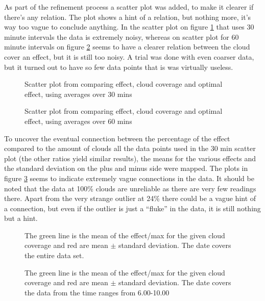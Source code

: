 As part of the refinement process a scatter plot was added, to make it
clearer if there's any relation.  The plot shows a hint of a relation,
but nothing more, it's way too vague to conclude anything.  In the
scatter plot on figure \ref{fig:scatter30} that uses 30 minute
intervals the data is extremely noisy, whereas on scatter plot for 60
minute intervals on figure \ref{fig:scatter60} seems to have a clearer
relation between the cloud cover an effect, but it is still too noisy.
A trial was done with even coarser data, but it turned out to have so
few data points that is was virtually useless.

\begin{figure}
  \centering
  \tiny
  
  \caption{Scatter plot from comparing effect, cloud coverage and
    optimal effect, using averages over 30 mins}
  \label{fig:scatter30}
\end{figure}

\begin{figure}
  \centering
      \tiny
      
  \caption{Scatter plot from comparing effect, cloud coverage and
    optimal effect, using averages over 60 mins}
  \label{fig:scatter60}
\end{figure}

To uncover the eventual connection between the percentage of the
effect compared to the amount of clouds all the data points used in
the 30 min scatter plot (the other ratios yield similar results),
the means for the various effects and the standard deviation on the
plus and minus side were mapped.  The plots in figure
\ref{fig:stattotal} seems to indicate extremely vague connections in
the data.  It should be noted that the data at 100\% clouds are
unreliable as there are very few readings there.  Apart from the very
strange outlier at 24\% there could be a vague hint of a connection,
but even if the outlier is just a ``fluke'' in the data, it is still
nothing but a hint.

\begin{figure}
  \centering    
  \tiny
  
  \caption{The green line is the mean of the effect/max for the given
    cloud coverage and red are mean $\pm$ standard deviation.  The
    date covers the entire data set.}
  \label{fig:stattotal}
\end{figure}

\begin{figure}
  \centering
  \tiny
  
  \caption{The green line is the mean of the effect/max for the given
    cloud coverage and red are mean $\pm$ standard deviation.  The
    date covers the data from the time ranges from 6.00-10.00}
  \label{fig:stat0610}
\end{figure}

